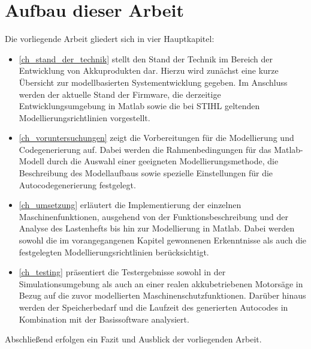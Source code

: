 \section{Aufbau dieser Arbeit}
 Die vorliegende Arbeit gliedert sich in vier Hauptkapitel:
\begin{itemize}
\item \autoref{ch_stand_der_technik} stellt den Stand der Technik im Bereich der Entwicklung von Akkuprodukten dar. Hierzu wird zunächst eine kurze Übersicht zur modellbasierten Systementwicklung gegeben. Im Anschluss werden der aktuelle Stand der Firmware, die derzeitige Entwicklungsumgebung in Matlab sowie die bei STIHL geltenden Modellierungsrichtlinien vorgestellt.	
\item \autoref{ch_voruntersuchungen} zeigt die Vorbereitungen für die Modellierung und Codegenerierung auf. Dabei werden die Rahmenbedingungen für das Matlab-Modell durch die Auswahl einer geeigneten Modellierungsmethode, die Beschreibung des Modellaufbaus sowie spezielle Einstellungen für die Autocodegenerierung festgelegt.
\item \autoref{ch_umsetzung} erläutert die Implementierung der einzelnen Maschinenfunktionen, ausgehend von der Funktionsbeschreibung und der Analyse des Lastenhefts bis hin zur Modellierung in Matlab. Dabei werden sowohl die im vorangegangenen Kapitel gewonnenen Erkenntnisse als auch die festgelegten Modellierungsrichtlinien berücksichtigt.
\item \autoref{ch_testing} präsentiert die Testergebnisse sowohl in der Simulationsumgebung als auch an einer realen akkubetriebenen Motorsäge in Bezug auf die zuvor modellierten Maschinenschutzfunktionen. Darüber hinaus werden der Speicherbedarf und die Laufzeit des generierten Autocodes in Kombination mit der Basissoftware analysiert.
\end{itemize}
Abschließend erfolgen ein Fazit und Ausblick der vorliegenden Arbeit.


